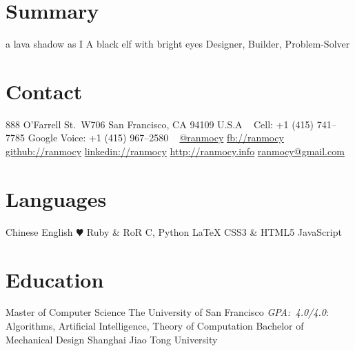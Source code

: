 \documentclass[]{friggeri-cv} %
\begin{document}


\begin{aside} %
  \section{Summary}
  a lava shadow as I
  A black elf
  with bright eyes
  Designer, Builder, Problem-Solver
  \section{Contact}
  888 O'Farrell St.\ W706
  San Francisco, CA 94109
  U.S.A
  ~
  Cell:
  +1 (415) 741--7785
  Google Voice:
  +1 (415) 967--2580
  ~
  \href{https://twitter.com/ranmocy}{@ranmocy}
  \href{https://facebook.com/ranmocy}{fb://ranmocy}
  \href{https://github.com/ranmocy}{github://ranmocy}
  \href{http://www.linkedin.com/in/ranmocy}{linkedin://ranmocy}
  \href{http://ranmocy.info}{http://ranmocy.info}
  \href{mailto:ranmocy@gmail.com}{ranmocy@gmail.com}
  \section{Languages}
  Chinese
  English
  {\color{red} $\varheartsuit$} Ruby \& RoR
  C, Python
  LaTeX
  CSS3 \& HTML5
  JavaScript
\end{aside}


\section{Education}

\begin{entrylist}
  {Master \textnormal{of Computer Science}}
  {The University of San Francisco}
  {
    \emph{GPA:~4.0/4.0}: Algorithms, Artificial Intelligence, Theory of Computation
  }
  {Bachelor \textnormal{of Mechanical Design}}
  {Shanghai Jiao Tong University}
  {}
\end{entrylist}
\end{document}
